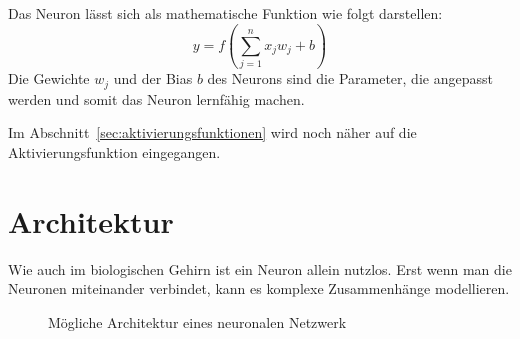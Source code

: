 \documentclass[12pt,a4paper]{report}
\begin{document}
Das Neuron lässt sich als mathematische Funktion wie folgt darstellen:
\[y =f\left(\sum_{j=1}^{n} x_j w_j + b\right)\]
Die Gewichte $w_j$ und der Bias $b$ des Neurons sind die Parameter, die angepasst werden und somit das Neuron lernfähig machen.

Im Abschnitt~\ref{sec:aktivierungsfunktionen} wird noch näher auf die Aktivierungsfunktion eingegangen.

\section{Architektur}
Wie auch im biologischen Gehirn ist ein Neuron allein nutzlos.
Erst wenn man die Neuronen miteinander verbindet, kann es komplexe Zusammenhänge modellieren.
\begin{figure}[h]
    \centering
{}
    \caption{Mögliche Architektur eines neuronalen Netzwerk}
    \label{fig:network1}
\end{figure}
\end{document}
